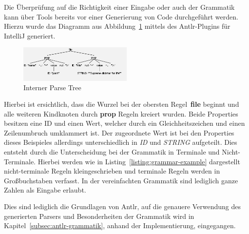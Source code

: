 Die Überprüfung auf die Richtigkeit einer Eingabe oder auch der Grammatik kann über Tools bereits vor einer Generierung von Code durchgeführt werden.
Hierzu wurde das Diagramm aus Abbildung~\ref{fig:parse-example} mittels des Antlr-Plugins für IntelliJ generiert.

\begin{figure}[h]
    \centering
    \includegraphics[width=0.5\textwidth]{images/2.2/parseTreeExample}
    \caption{Interner Parse Tree}
    \label{fig:parse-example}
\end{figure}

Hierbei ist ersichtlich, dass die Wurzel bei der obersten Regel~\textbf{file} beginnt und alle weiteren Kindknoten durch \textbf{prop} Regeln kreiert wurden.
Beide Properties besitzen eine ID und einen Wert, welcher durch ein Gleichheitszeichen und einen Zeilenumbruch umklammert ist.
Der zugeordnete Wert ist bei den Properties dieses Beispieles allerdings unterschiedlich in \textit{ID} und \textit{STRING} aufgeteilt.
Dies entsteht durch die Unterscheidung bei der Grammatik in Terminale und Nicht-Terminale.
Hierbei werden wie in Listing~\ref{listing:grammar-example} dargestellt nicht-terminale Regeln kleingeschrieben und terminale Regeln werden in Großbuchstaben verfasst.
In der vereinfachten Grammatik sind lediglich ganze Zahlen als Eingabe erlaubt.

Dies sind lediglich die Grundlagen von Antlr, auf die genauere Verwendung des generierten Parsers und Besonderheiten der Grammatik wird in Kapitel~\ref{subsec:antlr-grammatik},
anhand der Implementierung, eingegangen.